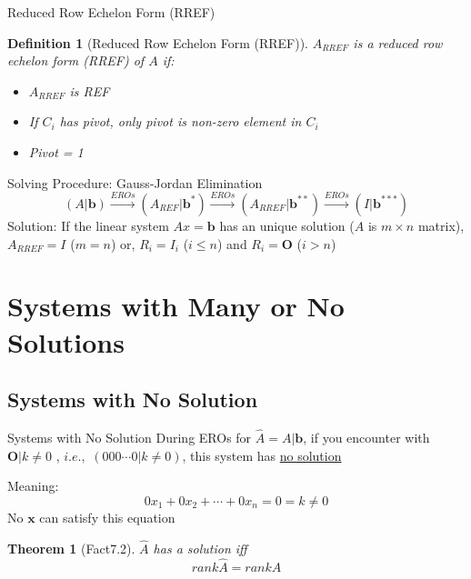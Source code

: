 \documentclass[final]{beamer}
\newtheorem{defn}{Definition}
\newtheorem{thm}{Theorem}
\begin{document}
\begin{frame}[t]{Reduced Row Echelon Form (RREF)}
	\begin{defn}
		[Reduced Row Echelon Form (RREF)]
		$A_{RREF}$ is a reduced row echelon form (RREF) of $A$ if:
		\begin{itemize}
			\item $A_{RREF}$ is REF
			\item If $C_i$ has pivot, only pivot is non-zero element in $C_i$
			\item Pivot = 1
		\end{itemize}
	\end{defn}
	\begin{block}
		{Solving Procedure: Gauss-Jordan Elimination}
		\[
			(A\vert \mathbf{b}) \xrightarrow{EROs} (A_{REF}\vert \mathbf{b}^\ast) \xrightarrow{EROs} (A_{RREF}\vert \mathbf{b}^{\ast\ast}) \xrightarrow{EROs} (I|\mathbf{b}^{\ast\ast\ast})
		\]
		Solution: If the linear system $Ax=\mathbf{b}$ has an unique solution ($A$ is $m\times n$ matrix), $A_{RREF}=I$ ($m=n$) or, $R_i = I_i$ ($i\le n$) and $R_i = \mathbf{O} $ ($i>n$)
	\end{block}
\end{frame}
\section{Systems with Many or No Solutions} %
\label{sec:systems_with_many_or_no_solutions}
\subsection{Systems with No Solution} %
\label{sub:systems_with_no_solution}
\begin{frame}[t]{Systems with No Solution}
	During EROs for $\hat A = A\vert \mathbf{b}$, if you encounter with $ \mathbf{O}\vert k\neq 0$ , $i.e.,$ $(0 0 0\cdots 0\vert k\neq 0)$, this system has \uline{no solution} 
	
	Meaning: \[
		0 x_1 + 0 x_2 + \cdots + 0 x_n = 0 = k \neq 0 \tag{contradiction!}
	\]
	No $\mathbf{x}$ can satisfy this equation
	\begin{thm}
		[Fact7.2]
		$\hat A$ has a solution iff \[
			rank \hat A = rank A
		\]
	\end{thm}
\end{frame}
\end{document}
